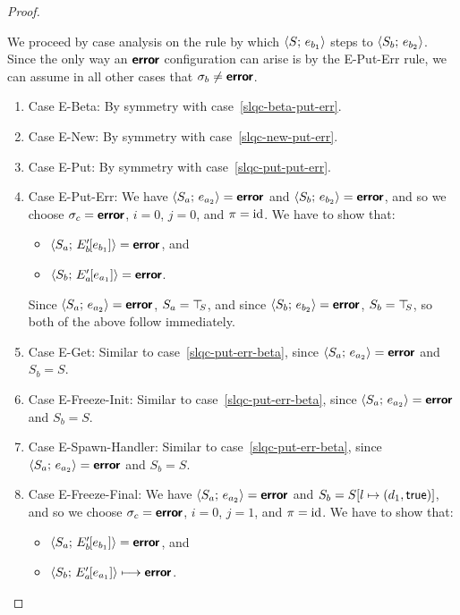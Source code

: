 \begin{proof}
\begin{enumerate}
    We proceed by case analysis on the rule by which
    $\langle S;\, e_{b_1} \rangle$ steps to $\langle S_b;\, e_{b_2} \rangle$.  Since the
    only way an $\textbf{\textsf{error}}$ configuration can arise is by the {\sc
      E-Put-Err} rule, we can assume in all other cases that $\sigma_b
    \neq \textbf{\textsf{error}}$.
    \begin{enumerate}
    \item \label{slqc-put-err-beta}Case {\sc E-Beta}: By symmetry with case~\ref{slqc-beta-put-err}.
    \item \label{slqc-put-err-new}Case {\sc E-New}: By symmetry with case~\ref{slqc-new-put-err}.
    \item \label{slqc-put-err-put}Case {\sc E-Put}: By symmetry with case~\ref{slqc-put-put-err}.
    \item \label{slqc-put-err-put-err}Case {\sc E-Put-Err}: We have
      $\langle S_a;\, e_{a_2} \rangle = \textbf{\textsf{error}}$ and $\langle S_b;\, e_{b_2} \rangle =
      \textbf{\textsf{error}}$, and so we choose $\sigma_c = \textbf{\textsf{error}}$, $i = 0$, $j = 0$,
      and $\pi = \mathrm{id}$.  We have to show that:
      \begin{itemize}
      \item $\langle S_a;\, E'_b\hspace{-1mm}\left[e_{b_1}\right] \rangle = \textbf{\textsf{error}}$, and
      \item
        $\langle S_b;\, E'_a\hspace{-1mm}\left[e_{a_1}\right] \rangle = \textbf{\textsf{error}}$.
      \end{itemize}

      Since $\langle S_a;\, e_{a_2} \rangle = \textbf{\textsf{error}}$, $S_a = \top\hspace{-0.85mm}_{S}$, and since
      $\langle S_b;\, e_{b_2} \rangle = \textbf{\textsf{error}}$, $S_b = \top\hspace{-0.85mm}_{S}$, so both of the
      above follow immediately.

    \item \label{slqc-put-err-get}Case {\sc E-Get}: Similar to
      case~\ref{slqc-put-err-beta}, since $\langle S_a;\, e_{a_2} \rangle =
      \textbf{\textsf{error}}$ and $S_b = S$.
    \item \label{slqc-put-err-freeze-init}Case {\sc E-Freeze-Init}:
      Similar to case~\ref{slqc-put-err-beta}, since
      $\langle S_a;\, e_{a_2} \rangle = \textbf{\textsf{error}}$ and $S_b = S$.
    \item \label{slqc-put-err-spawn-handler}Case {\sc
      E-Spawn-Handler}: Similar to case~\ref{slqc-put-err-beta}, since
      $\langle S_a;\, e_{a_2} \rangle = \textbf{\textsf{error}}$ and $S_b = S$.
    \item \label{slqc-put-err-freeze-final}Case {\sc E-Freeze-Final}:
      We have $\langle S_a;\, e_{a_2} \rangle = \textbf{\textsf{error}}$ and $S_b =
      S[l \mapsto (d_1, \textsf{true})]$, and so we choose $\sigma_c =
      \textbf{\textsf{error}}$, $i = 0$, $j = 1$, and $\pi = \mathrm{id}$.  We have to show
      that:
      \begin{itemize}
      \item $\langle S_a;\, E'_b\hspace{-1mm}\left[e_{b_1}\right] \rangle = \textbf{\textsf{error}}$,
        and
      \item
        $\langle S_b;\, E'_a\hspace{-1mm}\left[e_{a_1}\right] \rangle \longmapsto \textbf{\textsf{error}}$.
      \end{itemize}


\end{enumerate}
\end{enumerate}
\end{proof}
